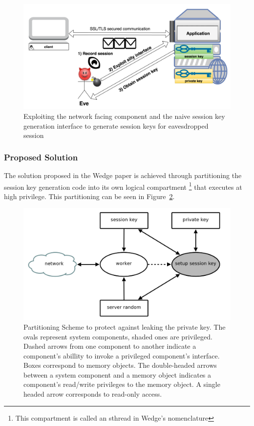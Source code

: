 \documentclass[../main.tex]{subfiles}
\begin{document}
\begin{enumerate}
    \begin{figure}[H] \centering
      \includegraphics[scale=0.15]{images/attack2.png}
      \caption{Exploiting the network facing component and the naive
        session key generation interface to generate session keys for
        eavesdropped session}
      \label{fig:attack2}
    \end{figure}
\end{enumerate}

\subsubsection*{Proposed Solution}

The solution proposed in the Wedge paper is achieved through
partitioning the session key generation code into its own logical
compartment \footnote{This compartment is called an sthread in Wedge's
  nomenclature} that executes at high privilege. This partitioning can
be seen in Figure~\ref{fig:wedge-partition}.

\begin{figure}[H]
  \centering
  \includegraphics[scale=0.25]{images/compartment_01.png}
  \caption{Partitioning Scheme to protect against leaking the private
    key. The ovals represent system components, shaded ones are
    privileged. Dashed arrows from one component to another indicate a
    component's abillity to invoke a privileged component's interface.
    Boxes correspond to memory objects. The double-headed arrows
    between a system component and a memory object indicates a
    component's read/write privileges to the memory object. A single
    headed arrow corresponds to read-only access.~\cite{Bittau08}}
  \label{fig:wedge-partition}
\end{figure}
\end{document}
